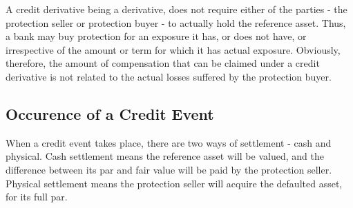 \documentclass[]{article}
\begin{document}
A credit derivative being a derivative, does not require either of the parties - the protection seller or protection buyer - to actually hold the reference asset. Thus, a bank may buy protection for an exposure it has, or does not have, or irrespective of the amount or term for which it has actual exposure. Obviously, therefore, the amount of compensation that can be claimed under a credit derivative is not related to the actual losses suffered by the protection buyer.
\subsection{Occurence of a Credit Event}
When a credit event takes place, there are two ways of settlement - cash and physical. Cash settlement means the reference asset will be valued, and the difference between its par and fair value will be paid by the protection seller. Physical settlement means the protection seller will acquire the defaulted asset, for its full par.
\end{document}
